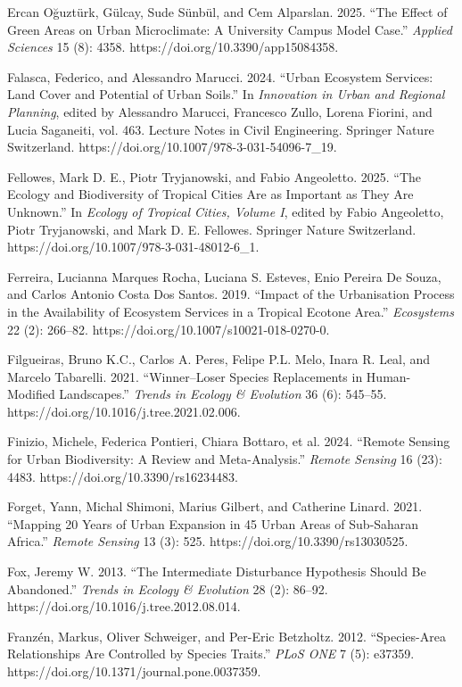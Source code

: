 Ercan Oğuztürk, Gülcay, Sude Sünbül, and Cem Alparslan. 2025. ``The Effect of Green Areas on Urban Microclimate: A University Campus Model Case.'' \emph{Applied Sciences} 15 (8): 4358. https://doi.org/10.3390/app15084358.

Falasca, Federico, and Alessandro Marucci. 2024. ``Urban Ecosystem Services: Land Cover and Potential of Urban Soils.'' In \emph{Innovation in Urban and Regional Planning}, edited by Alessandro Marucci, Francesco Zullo, Lorena Fiorini, and Lucia Saganeiti, vol. 463. Lecture Notes in Civil Engineering. Springer Nature Switzerland. https://doi.org/10.1007/978-3-031-54096-7\_19.

Fellowes, Mark D. E., Piotr Tryjanowski, and Fabio Angeoletto. 2025. ``The Ecology and Biodiversity of Tropical Cities Are as Important as They Are Unknown.'' In \emph{Ecology of Tropical Cities, Volume I}, edited by Fabio Angeoletto, Piotr Tryjanowski, and Mark D. E. Fellowes. Springer Nature Switzerland. https://doi.org/10.1007/978-3-031-48012-6\_1.

Ferreira, Lucianna Marques Rocha, Luciana S. Esteves, Enio Pereira De Souza, and Carlos Antonio Costa Dos Santos. 2019. ``Impact of the Urbanisation Process in the Availability of Ecosystem Services in a Tropical Ecotone Area.'' \emph{Ecosystems} 22 (2): 266--82. https://doi.org/10.1007/s10021-018-0270-0.

Filgueiras, Bruno K.C., Carlos A. Peres, Felipe P.L. Melo, Inara R. Leal, and Marcelo Tabarelli. 2021. ``Winner--Loser Species Replacements in Human-Modified Landscapes.'' \emph{Trends in Ecology \& Evolution} 36 (6): 545--55. https://doi.org/10.1016/j.tree.2021.02.006.

Finizio, Michele, Federica Pontieri, Chiara Bottaro, et al. 2024. ``Remote Sensing for Urban Biodiversity: A Review and Meta-Analysis.'' \emph{Remote Sensing} 16 (23): 4483. https://doi.org/10.3390/rs16234483.

Forget, Yann, Michal Shimoni, Marius Gilbert, and Catherine Linard. 2021. ``Mapping 20 Years of Urban Expansion in 45 Urban Areas of Sub-Saharan Africa.'' \emph{Remote Sensing} 13 (3): 525. https://doi.org/10.3390/rs13030525.

Fox, Jeremy W. 2013. ``The Intermediate Disturbance Hypothesis Should Be Abandoned.'' \emph{Trends in Ecology \& Evolution} 28 (2): 86--92. https://doi.org/10.1016/j.tree.2012.08.014.

Franzén, Markus, Oliver Schweiger, and Per-Eric Betzholtz. 2012. ``Species-Area Relationships Are Controlled by Species Traits.'' \emph{PLoS ONE} 7 (5): e37359. https://doi.org/10.1371/journal.pone.0037359.

